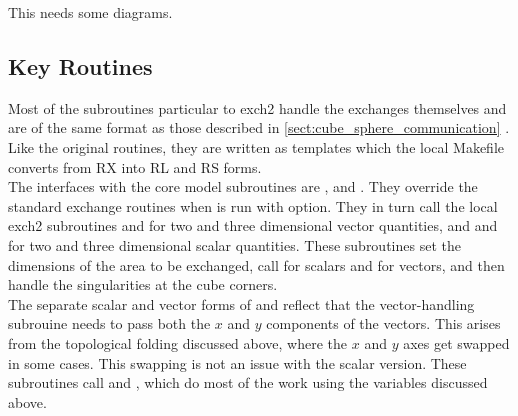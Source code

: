 This needs some diagrams. \\



\subsection{Key Routines}

Most of the subroutines particular to exch2 handle the exchanges
themselves and are of the same format as those described in
\ref{sect:cube_sphere_communication} .  Like the original routines, they are written as
templates which the local Makefile converts from RX into RL and RS
forms. \\

The interfaces with the core model subroutines are
,  and .
They override the standard exchange routines when  is
run with  option.  They in turn call the local exch2
subroutines  and  for two
and three dimensional vector quantities, and  and
 for two and three dimensional scalar quantities.
These subroutines set the dimensions of the area to be exchanged, call
 for scalars and  for
vectors, and then handle the singularities at the cube corners. \\

The separate scalar and vector forms of  and
 reflect that the vector-handling subrouine needs
to pass both the $x$ and $y$ components of the vectors.  This arises
from the topological folding discussed above, where the $x$ and $y$
axes get swapped in some cases.  This swapping is not an issue with
the scalar version. These subroutines call  and
, which do most of the work using the variables
discussed above. \\

